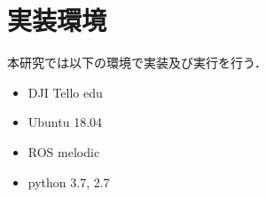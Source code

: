 \section{実装環境}
\label{env}

本研究では以下の環境で実装及び実行を行う．
\begin{itemize}
  \item DJI Tello edu
  \item Ubuntu 18.04
  \item ROS melodic
  \item python 3.7, 2.7
\end{itemize}
